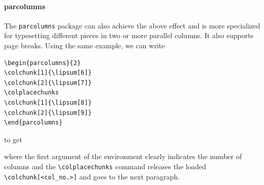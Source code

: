 \paragraph{parcolumns} The \verb|parcolumns| package can also achieve the above effect and is more specialized for typesetting different pieces in two or more parallel columns. It also supports page breaks. Using the same example, we can write
\begin{lstlisting}
\begin{parcolumns}{2}
\colchunk[1]{\lipsum[6]}
\colchunk[2]{\lipsum[7]}
\colplacechunks
\colchunk[1]{\lipsum[8]}
\colchunk[2]{\lipsum[9]}
\end{parcolumns}
\end{lstlisting}
to get\\
\begin{parcolumns}{2}
\colchunk[1]{\lipsum[6]}
\colchunk[2]{\lipsum[7]}
\colplacechunks
\colchunk[1]{\lipsum[8]}
\colchunk[2]{\lipsum[9]}
\end{parcolumns}
where the first argument of the environment clearly indicates the number of columns and the \texttt{\textbackslash colplacechunks} command releases the loaded \texttt{\textbackslash colchunk[<col\allowbreak\_no.>]} and goes to the next paragraph.

